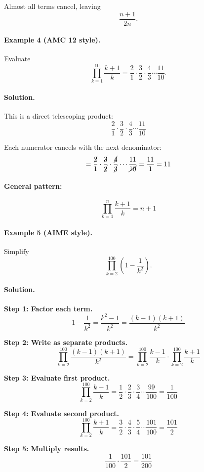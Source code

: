 \documentclass[12pt]{extarticle}
\begin{document}
Almost all terms cancel, leaving
\[
\frac{n+1}{2n}.
\]

\paragraph{Example 4 (AMC 12 style).}
Evaluate
\[
\prod_{k=1}^{10} \frac{k+1}{k} = \frac{2}{1} \cdot \frac{3}{2} \cdot \frac{4}{3} \cdots \frac{11}{10}.
\]

\paragraph{Solution.}
This is a direct telescoping product:
\[
\frac{2}{1} \cdot \frac{3}{2} \cdot \frac{4}{3} \cdots \frac{11}{10}
\]

Each numerator cancels with the next denominator:
\[
= \frac{\cancel{2}}{1} \cdot \frac{\cancel{3}}{\cancel{2}} \cdot \frac{\cancel{4}}{\cancel{3}} \cdots \frac{11}{\cancel{10}}
= \frac{11}{1} = 11
\]

\paragraph{General pattern:}
\[
\prod_{k=1}^{n} \frac{k+1}{k} = n+1
\]

\paragraph{Example 5 (AIME style).}
Simplify
\[
\prod_{k=2}^{100} \left(1 - \frac{1}{k^2}\right).
\]

\paragraph{Solution.}
\textbf{Step 1: Factor each term.}
\[
1 - \frac{1}{k^2} = \frac{k^2-1}{k^2} = \frac{(k-1)(k+1)}{k^2}
\]

\textbf{Step 2: Write as separate products.}
\[
\prod_{k=2}^{100} \frac{(k-1)(k+1)}{k^2}
= \prod_{k=2}^{100} \frac{k-1}{k} \cdot \prod_{k=2}^{100} \frac{k+1}{k}
\]

\textbf{Step 3: Evaluate first product.}
\[
\prod_{k=2}^{100} \frac{k-1}{k}
= \frac{1}{2} \cdot \frac{2}{3} \cdot \frac{3}{4} \cdots \frac{99}{100}
= \frac{1}{100}
\]

\textbf{Step 4: Evaluate second product.}
\[
\prod_{k=2}^{100} \frac{k+1}{k}
= \frac{3}{2} \cdot \frac{4}{3} \cdot \frac{5}{4} \cdots \frac{101}{100}
= \frac{101}{2}
\]

\textbf{Step 5: Multiply results.}
\[
\frac{1}{100} \cdot \frac{101}{2} = \frac{101}{200}
\]
\end{document}
